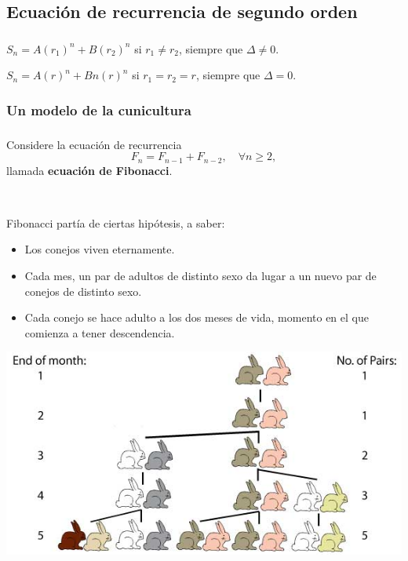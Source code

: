 \subsection{Ecuación de recurrencia de segundo orden}

\begin{frame}
\frametitle{\subsecname}

\begin{theorem}
$S_n = A(r_1)^n + B(r_2)^n$ si $r_1 \neq r_2$, siempre que $\Delta\neq0$.
\end{theorem}

\begin{theorem}
$S_n = A(r)^n + Bn(r)^n$ si $r_1 = r_2 = r$, siempre que $\Delta=0$.
\end{theorem}
\end{frame}

\subsubsection{Un modelo de la cunicultura}

\begin{frame}
\frametitle{\subsubsecname}

Considere la ecuación de recurrencia \[ F_{n}=F_{n-1}+F_{n-2},\quad\forall n\geq2, \] llamada \textbf{ecuación de Fibonacci}.

\

\begin{minipage}{0.45\paperwidth}
Fibonacci partía de ciertas hipótesis, a saber:
	\begin{itemize}
		\item Los conejos viven eternamente.
		\item Cada mes, un par de adultos de distinto sexo da lugar a un nuevo par de conejos de distinto sexo.
		\item Cada conejo se hace adulto a los dos meses de vida, momento en el que comienza a tener descendencia.
	\end{itemize}
\end{minipage}
\hfill
\begin{minipage}{0.45\paperwidth}
	\includegraphics[width=0.4\paperwidth]{conejos.jpg}
\end{minipage}

\end{frame}
